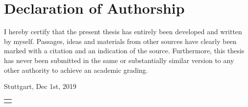 \chapter*{Declaration of Authorship}
\label{sec:declaration}
I hereby certify that the present thesis has entirely been developed and written by myself. Passages, ideas and materials from other sources have clearly been marked with a citation and an indication of the source. Furthermore, this thesis has never been submitted in the same or substantially similar version to any other authority to achieve an academic grading.

\hspace{1cm}

\begin{flushright}
Stuttgart, Dec 1st, 2019 \hphantom{\authorname}\hspace{1.5cm}

\begin{tabular}{r}
	\hline
	\hspace{1cm}\authorname
\end{tabular}
\end{flushright}
